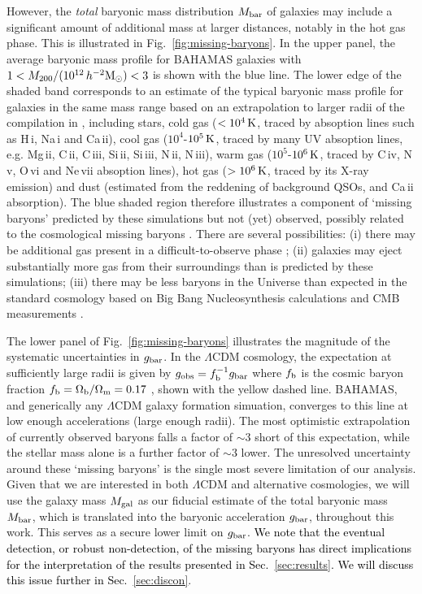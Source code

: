 \documentclass[usenatbib]{mnras}
\newcommand{\hmsun}{\,h^{-2} {\rm M_\odot}}
\newcommand{\un}[1]{_{\rm #1}}
\begin{document}
However, the \emph{total} baryonic mass distribution $M\un{bar}$ of galaxies may include a significant amount of additional mass at larger distances, notably in the hot gas phase. This is illustrated in Fig.~\ref{fig:missing-baryons}. In the upper panel, the average baryonic mass profile for BAHAMAS galaxies with $1<M_{200}/(10^{12}\hmsun)<3$ is shown with the blue line. The lower edge of the shaded band corresponds to an estimate of the typical baryonic mass profile for galaxies in the same mass range based on an extrapolation to larger radii of the compilation in \citet{tumlinson2017}, including stars, cold gas ($<10^4\,{\rm K}$, traced by absoption lines such as H\,{\sc i}, Na\,{\sc i} and Ca\,{\sc ii}), cool gas ($10^4$-$10^5\,{\rm K}$, traced by many UV absoption lines, e.g. Mg\,{\sc ii}, C\,{\sc ii}, C\,{\sc iii}, Si\,{\sc ii}, Si\,{\sc iii}, N\,{\sc ii}, N\,{\sc iii}), warm gas ($10^5$-$10^6\,{\rm K}$, traced by C\,{\sc iv}, N\,{\sc v}, O\,{\sc vi} and Ne\,{\sc vii} absoption lines), hot gas ($>10^6\,{\rm K}$, traced by its X-ray emission) and dust (estimated from the reddening of background QSOs, and Ca\,{\sc ii} absorption). The blue shaded region therefore illustrates a component of `missing baryons' predicted by these simulations but not (yet) observed, possibly related to the cosmological missing baryons \citep[e.g.][]{fukugita1998,fukugita2004,shull2012}. There are several possibilities: (i) there may be additional gas present in a difficult-to-observe phase \citep[e.g. hot, low-density gas, see for instance][]{nicastro2018}; (ii) galaxies may eject substantially more gas from their surroundings than is predicted by these simulations; (iii) there may be less baryons in the Universe than expected in the standard cosmology based on Big Bang Nucleosynthesis \cite[BBN,][]{kirkman2003} calculations and CMB measurements \cite[]{spergel2003,planck2014}.

The lower panel of Fig.~\ref{fig:missing-baryons} illustrates the magnitude of the systematic uncertainties in $g_{\rm bar}$. In the $\Lambda$CDM cosmology, the expectation at sufficiently large radii is given by $g\un{obs}=f^{-1}\un{b} g\un{bar}$ where $f\un b$ is the cosmic baryon fraction $f\un{b} = \Omega\un{b}/\Omega\un{m} = 0.17$ \cite[]{hinshaw2013}, shown with the yellow dashed line. BAHAMAS, and generically any $\Lambda$CDM galaxy formation simuation, converges to this line at low enough accelerations (large enough radii). The most optimistic extrapolation of currently observed baryons falls a factor of $\sim 3$ short of this expectation, while the stellar mass alone is a further factor of $\sim 3$ lower. The unresolved uncertainty around these `missing baryons' is the single most severe limitation of our analysis. Given that we are interested in both $\Lambda$CDM and alternative cosmologies, we will use the galaxy mass $M\un{gal}$ as our fiducial estimate of the total baryonic mass $M\un{bar}$, which is translated into the baryonic acceleration $g\un{bar}$, throughout this work. This serves as a secure lower limit on $g\un{bar}$. \textcolor{black}{We note that the eventual detection, or robust non-detection, of the missing baryons has direct implications for the interpretation of the results presented in Sec.~\ref{sec:results}. We will discuss this issue further in Sec.~\ref{sec:discon}}.
\end{document}
